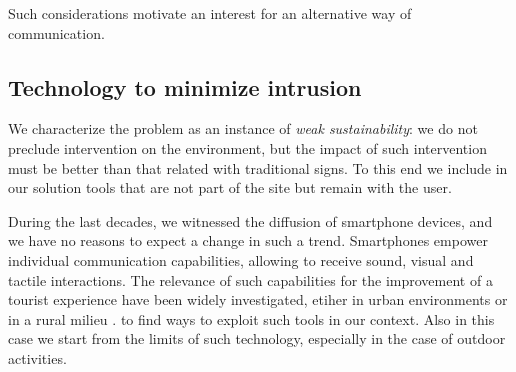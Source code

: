 \documentclass[sustainability,article,submit,pdftex,moreauthors]{Definitions/mdpi}
\begin{document}
Such considerations motivate an interest for an alternative way of communication.




\subsection{Technology to minimize intrusion \label{sec:minimize}}

We characterize the problem as an instance of {\em weak sustainability}: we do not preclude intervention on the environment, but the impact of such intervention must be better than that related with traditional signs. To this end we include in our solution tools that are not part of the site but remain with the user.   

During the last decades, we witnessed the diffusion of smartphone devices, and we have no reasons to expect a change in such a trend. Smartphones empower individual communication capabilities, allowing to receive sound, visual and tactile interactions. The relevance of such capabilities for the improvement of a tourist experience have been widely investigated, etiher in urban environments \cite{liu16a} or in a rural milieu \cite{kum20a}. to find ways to exploit such tools in our context. Also in this case we start from the limits of such technology, especially in the case of outdoor activities.
\end{document}
